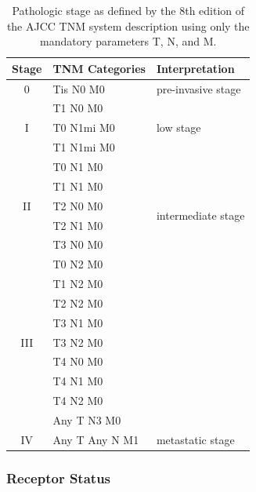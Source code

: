 \documentclass[11pt]{book}
\begin{document}
%
%
\begin{table}[t]
\centering
\caption[TNM Staging]{Pathologic stage as defined by the 8th edition of the AJCC TNM system description using only the mandatory parameters T, N, and M.}
\label{tab:stage}
\begin{tabular}{ cll }
\toprule
Stage & TNM Categories & Interpretation \\
\midrule
\multirow{1}{*}{0}   & Tis N0 M0      & \multirow{1}{*}{pre-invasive stage} \\[4pt]
\multirow{3}{*}{I}   & T1 N0 M0       & \multirow{3}{*}{low stage} \\
                     & T0 N1mi M0     & \\
                     & T1 N1mi M0     & \\[4pt]
\multirow{5}{*}{II}  & T0 N1 M0       & \multirow{6}{*}{intermediate stage} \\
                     & T1 N1 M0       & \\
                     & T2 N0 M0       & \\
                     & T2 N1 M0       & \\
                     & T3 N0 M0       & \\[4pt]
\multirow{9}{*}{III} & T0 N2 M0       & \multirow{9}{*}{high stage} \\
                     & T1 N2 M0       & \\
                     & T2 N2 M0       & \\
                     & T3 N1 M0       & \\
                     & T3 N2 M0       & \\
                     & T4 N0 M0       & \\
                     & T4 N1 M0       & \\
                     & T4 N2 M0       & \\
                     & Any T N3 M0    & \\[4pt]
\multirow{1}{*}{IV}  & Any T Any N M1 & \multirow{1}{*}{metastatic stage} \\
\bottomrule
\end{tabular}
\end{table}


\subsubsection{Receptor Status}
\end{document}
